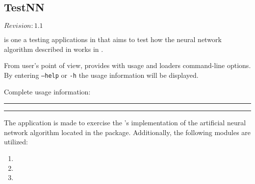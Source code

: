 \subsection{TestNN}

$Revision: 1.1 $

 is one a testing applications in {\marf}
that aims to test how the neural network algorithm described in  works in
.

From user's point of view,  provides with usage and loaders
command-line options. By entering \texttt{--help} or \texttt{-h}
the usage information will be displayed.

\noindent
Complete usage information:

\vspace{15pt}
\hrule

\hrule
\vspace{15pt}

The application is made to exercise the {\marf}'s implementation of the
artificial neural network algorithm located in the  package.
Additionally, the following {\marf} modules are utilized:

\begin{enumerate}
\item
{}

\item
{}

\item
{}
\end{enumerate}

